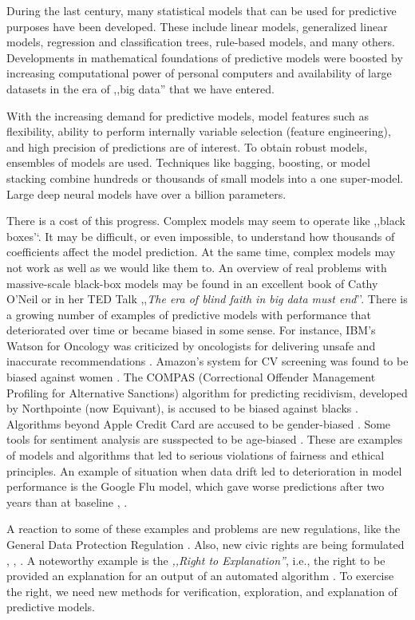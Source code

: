 \documentclass[12pt,]{krantz}
\begin{document}
During the last century, many statistical models that can be used for predictive purposes have been developed. These include linear models, generalized linear models, regression and classification trees, rule-based models, and many others. Developments in mathematical foundations of predictive models were boosted by increasing computational power of personal computers and availability of large datasets in the era of ,,big data'' that we have entered.

With the increasing demand for predictive models, model features such as flexibility, ability to perform internally variable selection (feature engineering), and high precision of predictions are of interest. To obtain robust models, ensembles of models are used. Techniques like bagging, boosting, or model stacking combine hundreds or thousands of small models into a one super-model. Large deep neural models have over a billion parameters.

There is a cost of this progress. Complex models may seem to operate like ,,black boxes'`. It may be difficult, or even impossible, to understand how thousands of coefficients affect the model prediction. At the same time, complex models may not work as well as we would like them to. An overview of real problems with massive-scale black-box models may be found in an excellent book of Cathy O'Neil \citep{ONeil} or in her TED Talk ,,\emph{The era of blind faith in big data must end}''. There is a growing number of examples of predictive models with performance that deteriorated over time or became biased in some sense. For instance, IBM's Watson for Oncology was criticized by oncologists for delivering unsafe and inaccurate recommendations \citep{IBMWatson}. Amazon's system for CV screening was found to be biased against women \citep{AmazonAI}. The COMPAS (Correctional Offender Management Profiling for Alternative Sanctions) algorithm for predicting recidivism, developed by Northpointe (now Equivant), is accused to be biased against blacks \citep{COMPAS}. Algorithms beyond Apple Credit Card are accused to be gender-biased \citep{AppleCreditCard}. Some tools for sentiment analysis are susspected to be age-biased \citep{Diaz2018}. These are examples of models and algorithms that led to serious violations of fairness and ethical principles. An example of situation when data drift led to deterioration in model performance is the Google Flu model, which gave worse predictions after two years than at baseline \citep{GoogleFLU}, \citep{Lazer1203}.

A reaction to some of these examples and problems are new regulations, like the General Data Protection Regulation \citep{EUGDPR}. Also, new civic rights are being formulated \citep{RightToExpl}, \citep{RightToExpl2}, \citep{RightToExpl3}. A noteworthy example is the \emph{,,Right to Explanation''}, i.e., the right to be provided an explanation for an output of an automated algorithm \citep{RightToExpl}. To exercise the right, we need new methods for verification, exploration, and explanation of predictive models.
\end{document}
